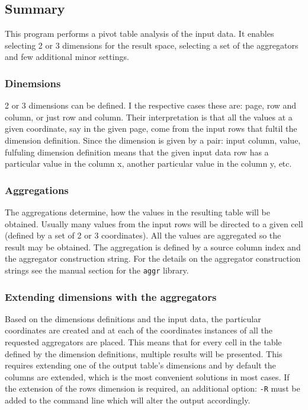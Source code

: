 \documentclass{report}
\begin{document}
\subsection{Summary}
This program performs a pivot table analysis of the input data. It enables
selecting 2 or 3 dimensions for the result space, selecting a set of the
aggregators and few additional minor settings.

\subsubsection{Dinemsions}
2 or 3 dimensions can be defined. I the respective cases these are: page, row
and column, or just row and column. Their interpretation is that all the values
at a given coordinate, say in the given page, come from the input rows that fultil
the dimension definition. Since the dimension is given by a pair: input column,
value, fulfuling dimension definition means that the given input data row has
a particular value in the column x, another particular value in the column y, etc.

\subsubsection{Aggregations}
The aggregations determine, how the values in the resulting table will be obtained.
Usually many values from the input rows will be directed to a given cell (defined
by a set of 2 or 3 coordinates). All the values are aggregated so the result may
be obtained. The aggregation is defined by a source column index and the aggregator
construction string. For the details on the aggregator construction strings see
the manual section for the \texttt{aggr} library.

\subsubsection{Extending dimensions with the aggregators}
Based on the dimensions definitions and the input data, the particular coordinates
are created and at each of the coordinates instances of all the requested aggregators
are placed. This means that for every cell in the table defined by the dimension
definitions, multiple results will be presented. This requires extending one of the
output table's dimensions and by default the columns are extended, which is the
most convenient solutions in most cases. If the extension of the rows dimension
is required, an additional option: \texttt{-R} must be added to the command line
which will alter the output accordingly.
\end{document}
